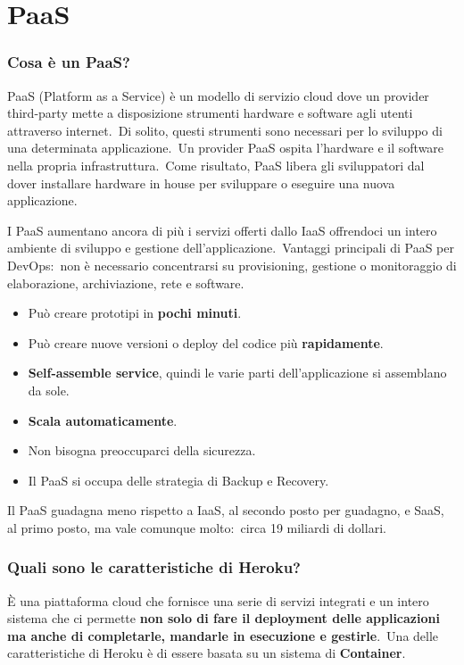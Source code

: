\documentclass[12pt, a4paper]{article}
\begin{document}
\section{PaaS}

\subsubsection*{Cosa è un PaaS?}

PaaS (Platform as a Service) è un modello di servizio cloud dove un provider third-party mette a disposizione strumenti hardware e software agli utenti attraverso internet.\
Di solito, questi strumenti sono necessari per lo sviluppo di una determinata applicazione.\
Un provider PaaS ospita l'hardware e il software nella propria infrastruttura.\
Come risultato, PaaS libera gli sviluppatori dal dover installare hardware in house per sviluppare o eseguire una nuova applicazione.

I PaaS aumentano ancora di più i servizi offerti dallo IaaS offrendoci un intero ambiente di sviluppo e gestione dell'applicazione.\
Vantaggi principali di PaaS per DevOps:\ non è necessario concentrarsi su provisioning, gestione o monitoraggio di elaborazione, archiviazione, rete e software.
\begin{itemize}
    \item Può creare prototipi in \textbf{pochi minuti}.
    \item Può creare nuove versioni o deploy del codice più \textbf{rapidamente}.
    \item \textbf{Self-assemble service}, quindi le varie parti dell'applicazione si assemblano da sole.
    \item \textbf{Scala automaticamente}.
    \item Non bisogna preoccuparci della sicurezza.
    \item Il PaaS si occupa delle strategia di Backup e Recovery.
\end{itemize}

\noindent Il PaaS guadagna meno rispetto a IaaS, al secondo posto per guadagno, e SaaS, al primo posto, ma vale comunque molto:\ circa 19 miliardi di dollari.

\subsubsection*{Quali sono le caratteristiche di Heroku?}
È una piattaforma cloud che fornisce una serie di servizi integrati e un intero sistema che ci permette \textbf{non solo di fare il deployment delle applicazioni ma anche di completarle, mandarle in esecuzione e gestirle}.\
Una delle caratteristiche di Heroku è di essere basata su un sistema di \textbf{Container}.\
\end{document}
